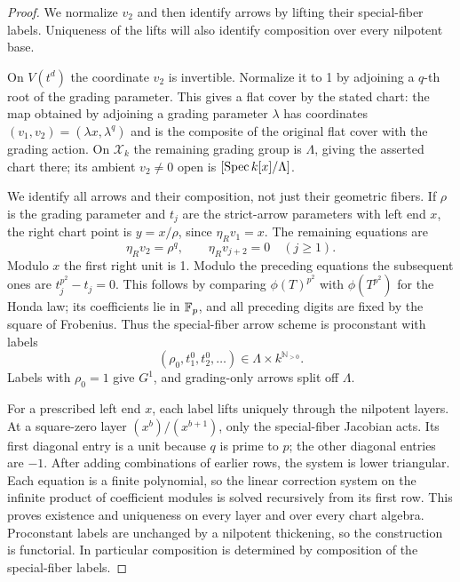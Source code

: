 \begin{proof}
We normalize $v_2$ and then identify arrows by lifting their
special-fiber labels.  Uniqueness of the lifts will also identify
composition over every nilpotent base.

On $V(t^d)$ the coordinate $v_2$ is invertible.  Normalize it to 1
by adjoining a $q$-th root of the grading parameter.  This gives a
flat cover by the stated chart: the map obtained by adjoining a
grading parameter $\lambda$ has coordinates
$(v_1,v_2)=(\lambda x,\lambda^q)$ and is the composite of the
original flat cover with the grading action.  On $\mathcal X_k$ the
remaining grading group is $\Lambda$, giving the asserted chart
there; its ambient $v_2\ne0$ open is $[\operatorname{Spec} k[x]/\Lambda]$.

We identify all arrows and their composition, not just their
geometric fibers.  If $\rho$ is the grading parameter and $t_j$ are
the strict-arrow parameters with left end $x$, the right chart point
is $y=x/\rho$, since $\eta_Rv_1=x$.  The remaining equations are
\begin{equation}\label{geom:nilpotent-arrow-equations}
 \eta_Rv_2=\rho^q,\qquad \eta_Rv_{j+2}=0\quad(j\geq1).
\end{equation}
Modulo $x$ the first right unit is 1.  Modulo the preceding equations
the subsequent ones are $t_j^{p^2}-t_j=0$.  This follows by comparing
$\phi(T)^{p^2}$ with $\phi(T^{p^2})$ for the Honda law; its
coefficients lie in $\mathbb F_p$, and all preceding digits are fixed by
the square of Frobenius.  Thus the special-fiber arrow scheme is
proconstant with labels
\[
 (\rho_0,t_1^0,t_2^0,\ldots)
       \in\Lambda\times k^{\mathbb N_{>0}}.
\]
Labels with $\rho_0=1$ give $G^1$, and grading-only arrows split
off $\Lambda$.

For a prescribed left end $x$, each label lifts uniquely through
the nilpotent layers.  At a square-zero layer
$(x^b)/(x^{b+1})$, only the special-fiber Jacobian acts.  Its first
diagonal entry is a unit because $q$ is prime to $p$; the other
diagonal entries are $-1$.  After adding combinations of earlier
rows, the system is lower triangular.  Each equation is a finite
polynomial, so the linear correction system on the infinite product
of coefficient modules is solved recursively from its first row.
This proves existence and uniqueness on every layer and over every
chart algebra.  Proconstant labels are unchanged by a nilpotent
thickening, so the construction is functorial.  In particular
composition is determined by composition of the special-fiber labels.


\end{proof}
